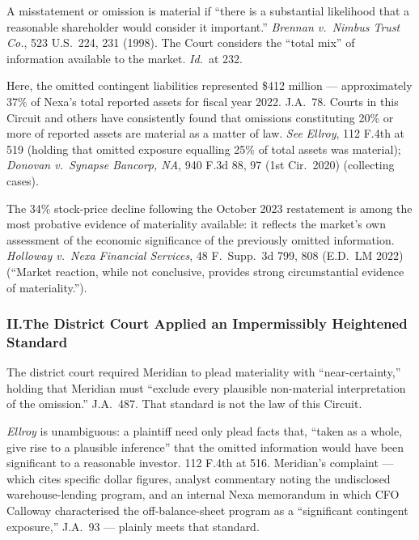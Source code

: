 \documentclass[12pt]{article}
\newcommand{\courtcase}[1]{\textit{#1}}
\begin{document}
A misstatement or omission is material if ``there is a substantial likelihood that
a reasonable shareholder would consider it important.'' \courtcase{Brennan v.\ Nimbus
Trust Co.}, 523 U.S.\ 224, 231 (1998). The Court considers the ``total mix'' of
information available to the market. \textit{Id.}\ at 232.

Here, the omitted contingent liabilities represented \$412 million --- approximately
37\% of Nexa's total reported assets for fiscal year 2022. J.A.\ 78. Courts in
this Circuit and others have consistently found that omissions constituting
20\% or more of reported assets are material as a matter of law. \textit{See}
\courtcase{Ellroy}, 112 F.4th at 519 (holding that omitted exposure equalling
25\% of total assets was material); \courtcase{Donovan v.\ Synapse Bancorp, NA},
940 F.3d 88, 97 (1st Cir.\ 2020) (collecting cases).

\begin{tcolorbox}[quotebox]
\small
The 34\% stock-price decline following the October 2023 restatement is among the
most probative evidence of materiality available: it reflects the market's own
assessment of the economic significance of the previously omitted information.
\courtcase{Holloway v.\ Nexa Financial Services}, 48 F.\ Supp.\ 3d 799, 808
(E.D.\ LM 2022) (``Market reaction, while not conclusive, provides strong
circumstantial evidence of materiality.'').
\end{tcolorbox}

\subsubsection{II.\quad The District Court Applied an Impermissibly Heightened Standard}

The district court required Meridian to plead materiality with ``near-certainty,''
holding that Meridian must ``exclude every plausible non-material interpretation
of the omission.'' J.A.\ 487. That standard is not the law of this Circuit.

\courtcase{Ellroy} is unambiguous: a plaintiff need only plead facts that, ``taken
as a whole, give rise to a plausible inference'' that the omitted information would
have been significant to a reasonable investor. 112 F.4th at 516. Meridian's
complaint --- which cites specific dollar figures, analyst commentary noting the
undisclosed warehouse-lending program, and an internal Nexa memorandum in which
CFO Calloway characterised the off-balance-sheet program as a ``significant
contingent exposure,'' J.A.\ 93 --- plainly meets that standard.
\end{document}
